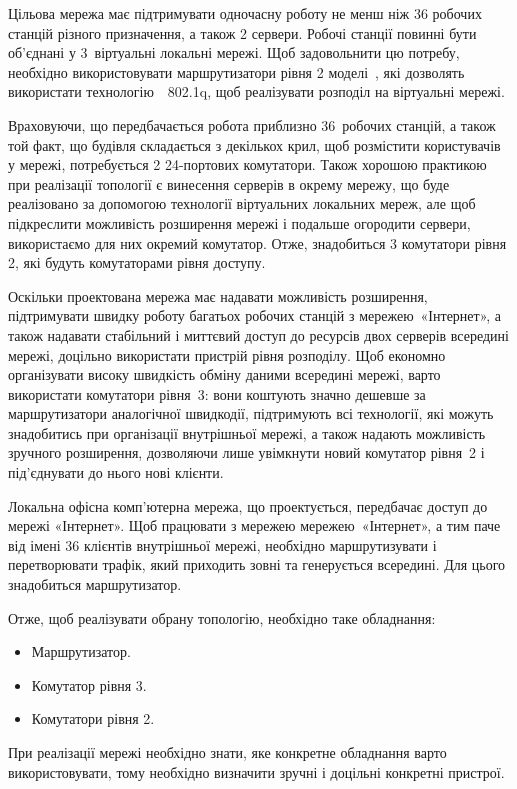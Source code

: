 \documentclass[
  ukrainian,
  simple,
]{eskdnaukvd}
\begin{document}
      Цільова мережа має підтримувати одночасну роботу не менш ніж 36 робочих станцій різного призначення, а також 2 сервери. Робочі станції повинні бути об'єднані у 3~віртуальні локальні мережі. Щоб задовольнити цю потребу, необхідно використовувати маршрутизатори рівня 2 моделі~\textenglish{}, які дозволять використати технологію~\textenglish{~802.1q}, щоб реалізувати розподіл на віртуальні мережі.

      Враховуючи, що передбачається робота приблизно 36~робочих станцій, а також той факт, що будівля складається з декількох крил, щоб розмістити користувачів у мережі, потребується 2 24-портових комутатори. Також хорошою практикою при реалізації топології є винесення серверів в окрему мережу, що буде реалізовано за допомогою технології віртуальних локальних мереж, але щоб підкреслити можливість розширення мережі і подальше огородити сервери, використаємо для них окремий комутатор. Отже, знадобиться 3 комутатори рівня 2, які будуть комутаторами рівня доступу.

      Оскільки проектована мережа має надавати можливість розширення, підтримувати швидку роботу багатьох робочих станцій з мережею~«Інтернет», а також надавати стабільний і миттєвий доступ до ресурсів двох серверів всередині мережі, доцільно використати пристрій рівня розподілу. Щоб економно організувати високу швидкість обміну даними всередині мережі, варто використати комутатори рівня~3: вони коштують значно дешевше за маршрутизатори аналогічної швидкодії, підтримують всі технології, які можуть знадобитись при організації внутрішньої мережі, а також надають можливість зручного розширення, дозволяючи лише увімкнути новий комутатор рівня~2 і під'єднувати до нього нові клієнти.

      Локальна офісна комп'ютерна мережа, що проектується, передбачає доступ до мережі «Інтернет». Щоб працювати з мережею мережею~«Інтернет», а тим паче від імені 36 клієнтів внутрішньої мережі, необхідно маршрутизувати і перетворювати трафік, який приходить зовні та генерується всередині. Для цього знадобиться маршрутизатор.

      Отже, щоб реалізувати обрану топологію, необхідно таке обладнання:
      \begin{itemize}
        \item Маршрутизатор.
        \item Комутатор рівня 3.
        \item Комутатори рівня 2.
      \end{itemize}
      При реалізації мережі необхідно знати, яке конкретне обладнання варто використовувати, тому необхідно визначити зручні і доцільні конкретні пристрої.
\end{document}

